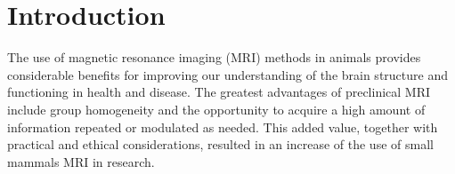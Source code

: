 \documentclass[utf8, a4paper, final, crop]{frontiersSCNS}
\begin{document}
\section{Introduction}

The use of magnetic resonance imaging (MRI) methods in animals
provides considerable benefits for improving our understanding
of the brain structure and functioning in health and disease.
The greatest advantages of preclinical MRI include
group homogeneity and the opportunity to acquire a high amount of information
repeated or modulated as needed.
This added value, together with practical and ethical considerations,
resulted in an increase of the use of small mammals MRI in research.
%
%
%
\end{document}
